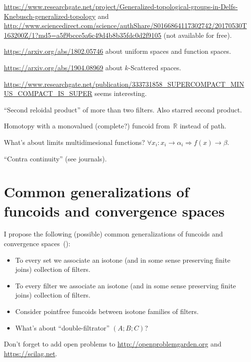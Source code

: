 \documentclass{amsart}
\begin{document}
\url{https://www.researchgate.net/project/Generalized-topological-groups-in-Delfs-Knebusch-generalized-topology}
and
\url{http://www.sciencedirect.com/science/authShare/S0166864117302742/20170530T163200Z/1?md5=a5f9bcce5a6c49d4b8b35fdc0d2f9105}
(not available for free).

\url{https://arxiv.org/abs/1802.05746} about uniform spaces and
function spaces.

\url{https://arxiv.org/abs/1904.08969} about $k$-Scattered spaces.

\url{https://www.researchgate.net/publication/333731858_SUPERCOMPACT_MINUS_COMPACT_IS_SUPER}
seems interesting.

``Second reloidal product'' of more than two filters.
Also starred second product.

Homotopy with a monovalued (complete?) funcoid from~$\mathbb{R}$
instead of path.

What's about limits multidimesional functions? $\forall x_i : x_i \rightarrow
\alpha_i \Rightarrow f (x) \rightarrow \beta$.

``Contra continuity'' (see journals).

\section{Common generalizations of funcoids and convergence spaces}

I propose the following (possible) common generalizations of funcoids and convergence spaces~(\cite{converg}):

\begin{itemize}
\item To every set we associate an isotone (and in some sense preserving finite joins) collection of filters.
\item To every filter we associate an isotone (and in some sense preserving finite joins) collection of filters.
\item Consider pointfree funcoids between isotone families of filters.
\item What's about ``double-filtrator'' $(A;B;C)$?
\end{itemize}

Don't forget to add open problems to
\url{http://openproblemgarden.org} and
\url{https://scilag.net}.



\end{document}
